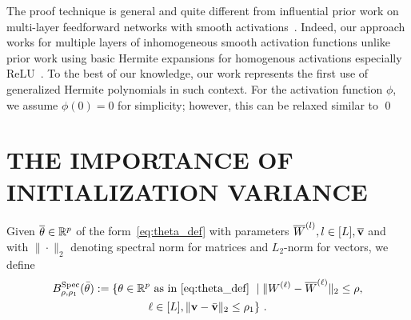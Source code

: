 \begin{remark}
The proof technique  is general and quite different from influential prior work on multi-layer feedforward networks with smooth activations~\citep{SD-JL-HL-LW-XZ:19}. Indeed, our approach works for multiple layers of inhomogeneous smooth activation functions unlike prior work using basic Hermite expansions for homogenous activations especially ReLU~\citep{ng2020hermite1,ng2021hermite2}. To the best of our knowledge, our work represents the first use of generalized Hermite polynomials in such context. For the activation function $\phi$, we assume $\phi(0)=0$ for simplicity; however, this can be relaxed similar to  \qed 
\end{remark}


\section{THE IMPORTANCE OF INITIALIZATION VARIANCE}
\label{sec:discuss-inivar}


%
\begin{defn}
Given $\overline{\theta}\in\mathbb{R}^p$ of the form~\eqref{eq:theta_def} with parameters $\overline{W}^{(l)}, l \in [L], \overline{\mathbf{v}}$ and
with $\| \cdot \|_2$ denoting spectral norm for matrices and $L_2$-norm for vectors, we define
\begin{multline}
B_{\rho, \rho_1}^{\operatorname{Spec}}(\bar{\theta})  := \{ \theta \in \mathbb{R}^p ~\text{as in \eqref{eq:theta_def}} ~\mid \| W^{(\ell)} - \overline{W}^{(\ell)} \|_2 \leq \rho,\nonumber \\
 \ell \in [L], \| \mathbf{v} - \bar{\mathbf{v}} \|_2 \leq \rho_1 \}~.\label{eq:specball} 
\end{multline}
\end{defn}

